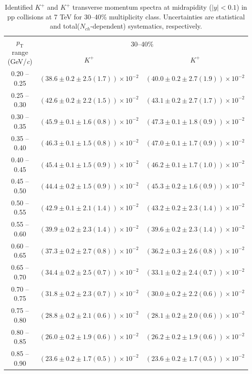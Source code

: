 \begin{table}
\caption{Identified $K^{+}$ and $K^{+}$  transverse momentum spectra at midrapidity ($|y|<0.1$) in pp collisions at 7 TeV for 30--40\% multiplicity class. Uncertainties are statistical and total($N_{ch}$-dependent) systematics, respectively.}
\label{tab:KaonPlus_KaonMinus_30to40}
\begin{center}
\begin{tabular}{ c | c c }
\hline
\multirow{2}{*}{$p_{\mathrm{T}}$ range (GeV/\textit{c})} & \multicolumn{2}{c}{30--40\%} \\ & $K^{+}$& $K^{+}$\\ 
\hline
0.20 -- 0.25 & $(38.6\pm0.2\pm2.5(1.7))\times10^{-2}$ & $(40.0\pm0.2\pm2.7(1.9))\times10^{-2}$ \\ 
0.25 -- 0.30 & $(42.6\pm0.2\pm2.2(1.5))\times10^{-2}$ & $(43.1\pm0.2\pm2.7(1.7))\times10^{-2}$ \\ 
0.30 -- 0.35 & $(45.9\pm0.1\pm1.6(0.8))\times10^{-2}$ & $(47.3\pm0.1\pm1.8(0.9))\times10^{-2}$ \\ 
0.35 -- 0.40 & $(46.3\pm0.1\pm1.5(0.8))\times10^{-2}$ & $(47.0\pm0.1\pm1.7(0.9))\times10^{-2}$ \\ 
0.40 -- 0.45 & $(45.4\pm0.1\pm1.5(0.9))\times10^{-2}$ & $(46.2\pm0.1\pm1.7(1.0))\times10^{-2}$ \\ 
0.45 -- 0.50 & $(44.4\pm0.2\pm1.5(0.9))\times10^{-2}$ & $(45.3\pm0.2\pm1.6(0.9))\times10^{-2}$ \\ 
0.50 -- 0.55 & $(42.9\pm0.1\pm2.1(1.4))\times10^{-2}$ & $(43.2\pm0.2\pm2.3(1.4))\times10^{-2}$ \\ 
0.55 -- 0.60 & $(39.9\pm0.2\pm2.3(1.4))\times10^{-2}$ & $(39.6\pm0.2\pm2.3(1.4))\times10^{-2}$ \\ 
0.60 -- 0.65 & $(37.3\pm0.2\pm2.7(0.8))\times10^{-2}$ & $(36.2\pm0.3\pm2.6(0.8))\times10^{-2}$ \\ 
0.65 -- 0.70 & $(34.4\pm0.2\pm2.5(0.7))\times10^{-2}$ & $(33.1\pm0.2\pm2.4(0.7))\times10^{-2}$ \\ 
0.70 -- 0.75 & $(31.8\pm0.2\pm2.3(0.7))\times10^{-2}$ & $(30.0\pm0.2\pm2.2(0.6))\times10^{-2}$ \\ 
0.75 -- 0.80 & $(28.8\pm0.2\pm2.1(0.6))\times10^{-2}$ & $(28.1\pm0.2\pm2.0(0.6))\times10^{-2}$ \\ 
0.80 -- 0.85 & $(26.0\pm0.2\pm1.9(0.6))\times10^{-2}$ & $(26.2\pm0.2\pm1.9(0.6))\times10^{-2}$ \\ 
0.85 -- 0.90 & $(23.6\pm0.2\pm1.7(0.5))\times10^{-2}$ & $(23.6\pm0.2\pm1.7(0.5))\times10^{-2}$ \\ 

\end{tabular}
\end{center}
\end{table}
